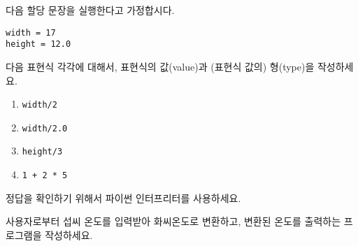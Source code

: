 \begin{ex}
다음 할당 문장을 실행한다고 가정합시다.

\begin{verbatim}
width = 17
height = 12.0
\end{verbatim}

다음 표현식 각각에 대해서, 표현식의 값(value)과 (표현식 값의) 형(type)을 작성하세요.

\begin{enumerate}

\item {\tt width/2}

\item {\tt width/2.0}

\item {\tt height/3}

\item {\tt 1 + 2 * 5}

\end{enumerate}

정답을 확인하기 위해서 파이썬 인터프리터를 사용하세요.

\end{ex}

\begin{ex}
사용자로부터 섭씨 온도를 입력받아 화씨온도로 변환하고, 변환된 온도를 출력하는 프로그램을 작성하세요.
\end{ex}


